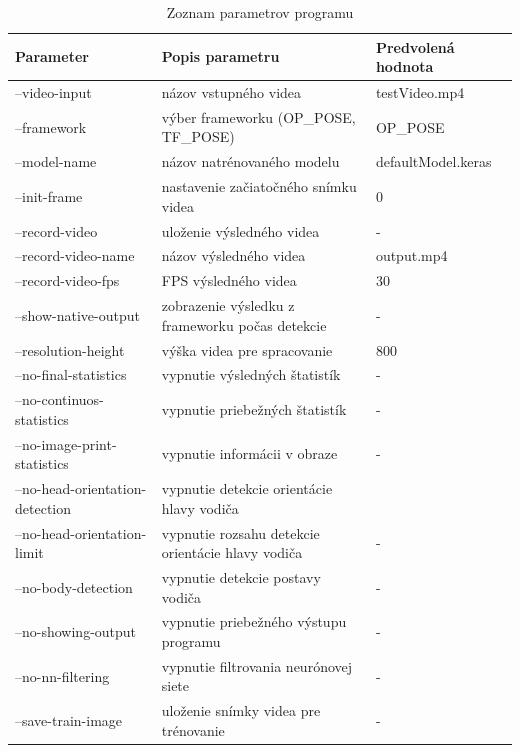 \documentclass[slovak,master,dept460,male,cpp,cpdeclaration]{diploma}
\begin{document}
\begin{table}[H]
\centering
\begin{tabular}{|l|p{65mm}|p{32mm}|}
\hline
\textbf{Parameter}        & \textbf{Popis parametru}   & \textbf{Predvolená hodnota} \\ \hline
--video-input      &  názov vstupného videa   & testVideo.mp4       \\ \hline
--framework      & výber frameworku (OP\_POSE, TF\_POSE)     & OP\_POSE   \\ \hline
--model-name      & názov natrénovaného modelu     & defaultModel.keras  \\ \hline
--init-frame      & nastavenie začiatočného snímku videa    & 0  \\ \hline
--record-video    & uloženie výsledného videa    & -  \\ \hline
--record-video-name    & názov výsledného videa  & output.mp4  \\ \hline
--record-video-fps    & FPS výsledného videa    & 30  \\ \hline
--show-native-output    & zobrazenie  výsledku z frameworku počas detekcie    & -  \\ \hline
--resolution-height    & výška videa pre spracovanie    & 800  \\ \hline 
--no-final-statistics    & vypnutie výsledných štatistík    & -  \\ \hline
--no-continuos-statistics    & vypnutie priebežných štatistík    & -  \\ \hline
--no-image-print-statistics    & vypnutie informácii v obraze & -  \\ \hline
--no-head-orientation-detection    & vypnutie detekcie orientácie hlavy vodiča    &   \\ \hline
--no-head-orientation-limit    & vypnutie  rozsahu detekcie orientácie hlavy vodiča    & -  \\ \hline
--no-body-detection    & vypnutie detekcie postavy vodiča   & -  \\ \hline
--no-showing-output    & vypnutie priebežného  výstupu programu    & -  \\ \hline
--no-nn-filtering    & vypnutie filtrovania neurónovej siete    & -  \\ \hline
--save-train-image    & uloženie snímky videa  pre trénovanie   & -  \\ \hline
\end{tabular}

	\caption{Zoznam parametrov programu}
	\label{tab:params}
\end{table}
\end{document}
